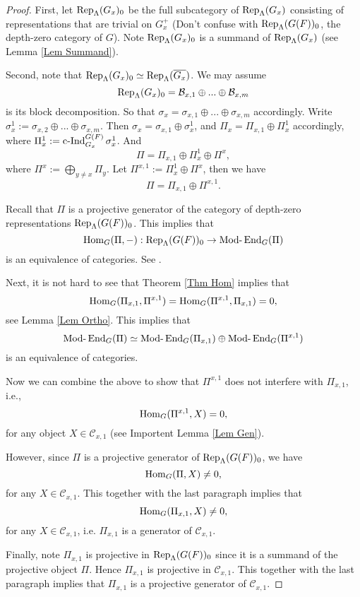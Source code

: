 	\begin{proof}
		First, let $\operatorname{\operatorname{Rep}}_{\Lambda}(G_x)_0$ be the full subcategory of $\operatorname{\operatorname{Rep}}_{\Lambda}(G_x)$ consisting of representations that are trivial on $G_x^+$ (Don't confuse with $\operatorname{\operatorname{Rep}}_{\Lambda}(G(F))_0$, the depth-zero category of $G$). Note $\operatorname{\operatorname{Rep}}_{\Lambda}(G_x)_0$ is a summand of $\operatorname{\operatorname{Rep}}_{\Lambda}(G_x)$ (see Lemma \ref{Lem Summand}).
		
		Second, note that $\operatorname{\operatorname{Rep}}_{\Lambda}(G_x)_0 \simeq \operatorname{\operatorname{Rep}}_{\Lambda}(\overline{G_x})$. We may assume $$\operatorname{\operatorname{Rep}}_{\Lambda}(G_x)_0=\mathcal{B}_{x,1} \oplus ... \oplus \mathcal{B}_{x,m}$$
		is its block decomposition. So that $\sigma_x=\sigma_{x,1}\oplus...\oplus\sigma_{x,m}$ accordingly. Write $\sigma_x^1:=\sigma_{x,2}\oplus...\oplus\sigma_{x,m}$. Then $\sigma_x=\sigma_{x,1} \oplus \sigma_x^1$, and $\Pi_x=\Pi_{x,1} \oplus \Pi_x^1$ accordingly, where $\Pi_x^1:=\operatorname{\operatorname{c-Ind}}_{G_x}^{G(F)}\sigma_x^1$. And
		$$\Pi=\Pi_{x,1}\oplus \Pi_x^1 \oplus \Pi^x,$$
		where $\Pi^x:=\bigoplus_{y \neq x}\Pi_y$. Let $\Pi^{x,1}:=\Pi_x^1 \oplus \Pi^x$, then we have
		$$\Pi=\Pi_{x,1} \oplus \Pi^{x,1}.$$
		
		Recall that $\Pi$ is a projective generator of the category of depth-zero representations $\operatorname{\operatorname{Rep}}_{\Lambda}(G(F))_0$. This implies that 
		$$\operatorname{\operatorname{Hom}}_G(\Pi, -): \operatorname{\operatorname{Rep}}_{\Lambda}(G(F))_0 \to \operatorname{Mod-}\operatorname{\operatorname{End}}_G(\Pi)$$
		is an equivalence of categories. See \cite[Lemma 22]{bernsteindraft}.
		
		Next, it is not hard to see that Theorem \ref{Thm Hom} implies that 
		$$\operatorname{\operatorname{Hom}}_G(\Pi_{x,1}, \Pi^{x,1})=\operatorname{\operatorname{Hom}}_G(\Pi^{x,1}, \Pi_{x,1})=0,$$
		see Lemma \ref{Lem Ortho}. This implies that $$\operatorname{Mod-}\operatorname{\operatorname{End}}_G(\Pi) \simeq \operatorname{Mod-}\operatorname{\operatorname{End}}_G(\Pi_{x,1}) \oplus \operatorname{Mod-}\operatorname{\operatorname{End}}_G(\Pi^{x,1})$$ is an equivalence of categories.
		
		Now we can combine the above to show that $\Pi^{x,1}$ does not interfere with $\Pi_{x,1}$, i.e.,
		$$\operatorname{\operatorname{Hom}}_G(\Pi^{x,1}, X)=0,$$
		for any object $X \in \mathcal{C}_{x,1}$ (see Importent Lemma \ref{Lem Gen}).
		
		However, since $\Pi$ is a projective generator of $\operatorname{\operatorname{Rep}}_{\Lambda}(G(F))_0$, we have
		$$\operatorname{\operatorname{Hom}}_G(\Pi, X) \neq 0,$$
		for any $X \in \mathcal{C}_{x,1}$. This together with the last paragraph implies that 
		$$\operatorname{\operatorname{Hom}}_G(\Pi_{x,1}, X) \neq 0,$$
		for any $X \in \mathcal{C}_{x,1}$, i.e. $\Pi_{x,1}$ is a generator of $\mathcal{C}_{x,1}$.
		
		Finally, note $\Pi_{x,1}$ is projective in $\operatorname{\operatorname{Rep}}_{\Lambda}(G(F))_0$ since it is a summand of the projective object $\Pi$. Hence $\Pi_{x,1}$ is projective in $\mathcal{C}_{x,1}$. This together with the last paragraph implies that $\Pi_{x,1}$ is a projective generator of $\mathcal{C}_{x,1}$.
	
		
	\end{proof}
	

